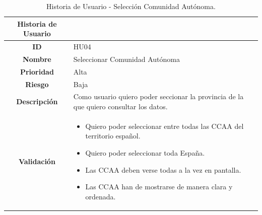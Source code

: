 \begin{table}[H]
	\begin{center}
		\begin{tabular}{| c | p{9cm} |}
			\hline
			
			Historia de Usuario &  \\ \hline
			
			
			\textbf{ID} & HU04 \\
			\textbf{Nombre} & Seleccionar Comunidad Autónoma \\
			\textbf{Prioridad} & Alta \\
			\textbf{Riesgo} & Baja \\
			\textbf{Descripción} & Como usuario quiero poder seccionar la provincia de la que quiero consultar los datos. \\
			\textbf{Validación} & \begin{itemize}
				\item Quiero poder seleccionar entre todas las CCAA del territorio español.
				\item Quiero poder seleccionar toda España.
				\item Las CCAA deben verse todas a la vez en pantalla.
				\item Las CCAA han de mostrarse de manera clara y ordenada.
			\end{itemize} \\ \hline
		\end{tabular}
		\caption{Historia de Usuario - Selección Comunidad Autónoma.}
	\end{center}
\end{table}

